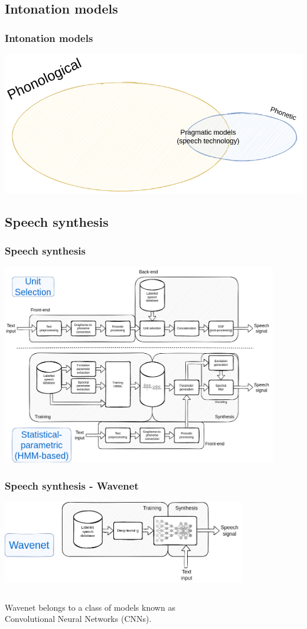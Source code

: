 \documentclass[a4paper,9pt]{beamer}
\theoremstyle{mytheoremstyle}
\begin{document}
\subsection{Intonation models}
\begin{frame}
\frametitle{Intonation models}
\includegraphics[width=\textwidth]{res/inotnation_models_venn.png}
\end{frame}

\subsection{Speech synthesis}
\begin{frame}
\frametitle{Speech synthesis}
\includegraphics[width=0.9\textwidth]{res/speech_synthesis_clunit_hmm.png}
\end{frame}

\begin{frame}
\frametitle{Speech synthesis - Wavenet}
\includegraphics[width=0.8\textwidth]{res/speech_synthesis_wavenet.png}
\begin{columns}
\begin{exampleblock}{}
Wavenet belongs to a class of models known as\\
Convolutional Neural Networks (CNNs).
\end{exampleblock}
\end{columns}
\end{frame}
\end{document}
